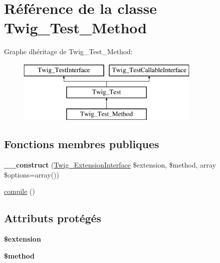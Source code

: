 \hypertarget{class_twig___test___method}{}\section{Référence de la classe Twig\+\_\+\+Test\+\_\+\+Method}
\label{class_twig___test___method}
Graphe d\textquotesingle{}héritage de Twig\+\_\+\+Test\+\_\+\+Method\+:\begin{figure}[H]
\begin{center}
\leavevmode
\includegraphics[height=3.000000cm]{class_twig___test___method}
\end{center}
\end{figure}
\subsection*{Fonctions membres publiques}
\begin{DoxyCompactItemize}
\item 
{\bfseries \+\_\+\+\_\+construct} (\hyperlink{interface_twig___extension_interface}{Twig\+\_\+\+Extension\+Interface} \$extension, \$method, array \$options=array())\hypertarget{class_twig___test___method_a7d07ee619832b0ff21eaf3c7c0159c3f}{}\label{class_twig___test___method_a7d07ee619832b0ff21eaf3c7c0159c3f}

\item 
\hyperlink{class_twig___test___method_a3815e7c2e73f00c2ebffcf5b90eef3b1}{compile} ()
\end{DoxyCompactItemize}
\subsection*{Attributs protégés}
\begin{DoxyCompactItemize}
\item 
{\bfseries \$extension}\hypertarget{class_twig___test___method_aed02cd2cd0ee08bd99a2ac1ef4f955ce}{}\label{class_twig___test___method_aed02cd2cd0ee08bd99a2ac1ef4f955ce}

\item 
{\bfseries \$method}\hypertarget{class_twig___test___method_a12661b2fc0f57f97e30a1620889ce9c6}{}\label{class_twig___test___method_a12661b2fc0f57f97e30a1620889ce9c6}

\end{DoxyCompactItemize}


